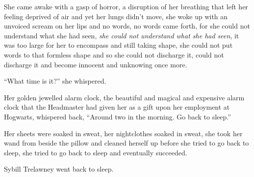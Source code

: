 She came awake with a gasp of horror, a disruption of her breathing that
left her feeling deprived of air and yet her lungs didn't move, she woke
up with an unvoiced scream on her lips and no words, no words came
forth, for she could not understand what she had seen, \emph{she could
not understand what she had seen}, it was too large for her to encompass
and still taking shape, she could not put words to that formless shape
and so she could not discharge it, could not discharge it and become
innocent and unknowing once more.

``What time is it?'' she whispered.

Her golden jewelled alarm clock, the beautiful and magical and expensive
alarm clock that the Headmaster had given her as a gift upon her
employment at Hogwarts, whispered back, ``Around two in the morning. Go
back to sleep.''

Her sheets were soaked in sweat, her nightclothes soaked in sweat, she
took her wand from beside the pillow and cleaned herself up before she
tried to go back to sleep, she tried to go back to sleep and eventually
succeeded.

Sybill Trelawney went back to sleep.

